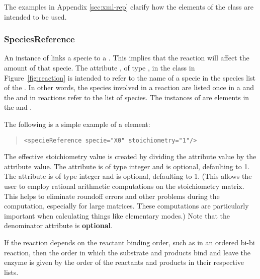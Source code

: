 \documentclass[10pt]{cek-article}
\begin{document}
The examples in Appendix \ref{sec:xml-rep} clarify how the
elements of the  class are intended to be used.

\subsubsection{SpeciesReference}

An instance of  links a specie to a
.  This implies that the reaction will affect the amount of
that specie. The attribute , of type , in the
 class in Figure~\ref{fig:reaction} is intended to
refer to the name of a specie in the species list of the .  In
other words, the species involved in a reaction are listed once in a
 and the  and 
in reactions refer to the list of species.  The instances of
 are  elements
in the  and .

The following is a simple example of a  element:
\begin{quote}
  \begin{small}
    \tightspacing
\begin{verbatim}
<specieReference specie="X0" stoichiometry="1"/>
\end{verbatim}
    \regularspacing
  \end{small}
\end{quote}

The effective stoichiometry value is created by dividing the
 attribute value by the
 attribute value. The attribute
 is of type integer and is optional,
defaulting to 1. The attribute  is of type
integer and is optional, defaulting to 1. (This allows the user to
employ rational arithmetic computations on the stoichiometry
matrix. This helps to eliminate roundoff errors and other
problems during the computation, especially for large matrices.
These computations are particularly important when calculating
things like elementary modes.) Note that the denominator attribute is
{\bfseries optional}.

If the reaction depends on the reactant binding order, such as in
an ordered bi-bi reaction, then the order in which the substrate
and products bind and leave the enzyme is given by the order of
the reactants and products in their respective lists.
\end{document}
